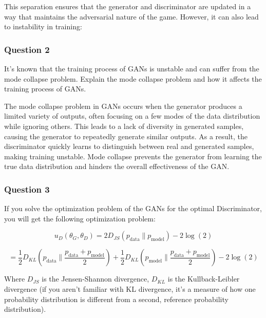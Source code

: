\begin{qsolve}
\begin{qsolve}[]
        This separation ensures that the generator and discriminator are updated in a way that maintains the adversarial nature of the game. However, it can also lead to instability in training:

       \end{qsolve}
\end{qsolve}
\subsubsection{Question 2}

It's known that the training process of GANs is unstable and can suffer from the mode collapse problem. Explain the mode collapse problem and how it affects the training process of GANs.
\begin{qsolve}
    \begin{qsolve}[]
        The mode collapse problem in GANs occurs when the generator produces a limited variety of outputs, often focusing on a few modes of the data distribution while ignoring others. This leads to a lack of diversity in generated samples, causing the generator to repeatedly generate similar outputs. As a result, the discriminator quickly learns to distinguish between real and generated samples, making training unstable. Mode collapse prevents the generator from learning the true data distribution and hinders the overall effectiveness of the GAN.
    \end{qsolve}
\end{qsolve}
\subsubsection{Question 3}

If you solve the optimization problem of the GANs for the optimal Discriminator, you will get the following optimization problem:

\[
u_D(\theta_G, \theta_D) = 2 D_{JS}(p_{\text{data}} \| p_{\text{model}}) - 2 \log(2)
\]

\[
= \frac{1}{2} D_{KL}(p_{\text{data}} \| \frac{p_{\text{data}} + p_{\text{model}}}{2}) + \frac{1}{2} D_{KL}(p_{\text{model}} \| \frac{p_{\text{data}} + p_{\text{model}}}{2}) - 2 \log(2)
\]

Where $D_{JS}$ is the Jensen-Shannon divergence, $D_{KL}$ is the Kullback-Leibler divergence (if you aren't familiar with KL divergence, it's a measure of how one probability distribution is different from a second, reference probability distribution).

